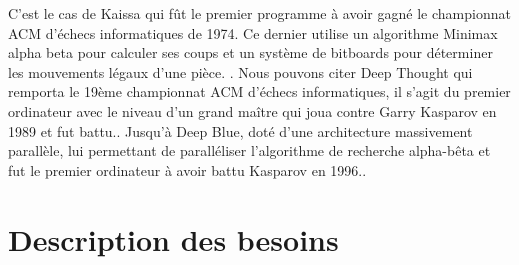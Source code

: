 \documentclass{article}
\begin{document}
\newline
C'est le cas de Kaissa qui fût le premier programme à avoir gagné le championnat ACM d'échecs informatiques de 1974. Ce dernier utilise un algorithme Minimax alpha beta \cite{KaissaAB} pour calculer ses coups et un système de bitboards pour déterminer les mouvements légaux d'une pièce. \cite{Kaissa}\cite{KaissaBitboard}\cite{RotatedBitBoards}.
\newline
Nous pouvons citer Deep Thought qui remporta le 19ème championnat ACM d'échecs informatiques, il s'agit du premier ordinateur avec le niveau d'un grand maître qui joua contre Garry Kasparov en 1989 et fut battu.\cite{Deep}. 
\newline
Jusqu'à Deep Blue, doté d'une architecture massivement parallèle, lui permettant de paralléliser l'algorithme de recherche alpha-bêta\cite{DeepSystem} et fut le premier ordinateur à avoir battu Kasparov en 1996.\cite{Deep}.





\newpage
\section{Description des besoins}

\end{document}
